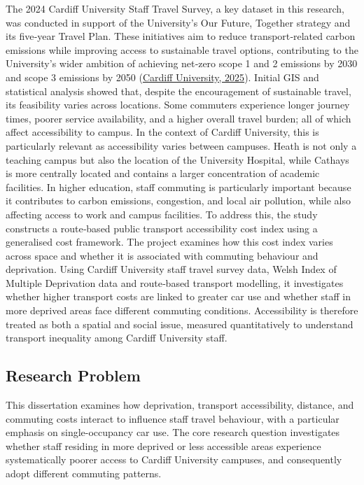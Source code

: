 \documentclass[11pt,a4paper]{article}
\newcommand{\hcite}[2]{\hyperlink{#1}{#2}}
\newcommand{\hcite}[2]{\hyperlink{#1}{#2}}
\begin{document}
The 2024 Cardiff University Staff Travel Survey, a key dataset in this research, was conducted in support of the University’s Our Future, Together strategy and its five‑year Travel Plan. These initiatives aim to reduce transport‑related carbon emissions while improving access to sustainable travel options, contributing to the University’s wider ambition of achieving net‑zero scope 1 and 2 emissions by 2030 and scope 3 emissions by 2050 (\hcite{cardiff2025}{Cardiff University, 2025}).
Initial GIS and statistical analysis showed that, despite the encouragement of sustainable travel, its feasibility varies across locations. Some commuters experience longer journey times, poorer service availability, and a higher overall travel burden; all of which affect accessibility to campus.
In the context of Cardiff University, this is particularly relevant as accessibility varies between campuses. Heath is not only a teaching campus but also the location of the University Hospital, while Cathays is more centrally located and contains a larger concentration of academic facilities. In higher education, staff commuting is particularly important because it contributes to carbon emissions, congestion, and local air pollution, while also affecting access to work and campus facilities.
To address this, the study constructs a route‑based public transport accessibility cost index using a generalised cost framework. The project examines how this cost index varies across space and whether it is associated with commuting behaviour and deprivation. Using Cardiff University staff travel survey data, Welsh Index of Multiple Deprivation data and route‑based transport modelling, it investigates whether higher transport costs are linked to greater car use and whether staff in more deprived areas face different commuting conditions. Accessibility is therefore treated as both a spatial and social issue, measured quantitatively to understand transport inequality among Cardiff University staff.


\subsection{Research Problem}

This dissertation examines how deprivation, transport accessibility, distance, and commuting costs interact to influence staff travel behaviour, with a particular emphasis on single-occupancy car use. The core research question investigates whether staff residing in more deprived or less accessible areas experience systematically poorer access to Cardiff University campuses, and consequently adopt different commuting patterns.
\end{document}
